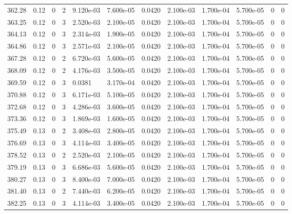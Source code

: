 \documentclass[preview]{standalone}
\begin{document}
{{{{{{{{{\begin{tabular}{L{1.2cm}C{1.2cm} C{0.3cm}C{0.5cm} C{1.4cm}C{1.4cm} C{1.4cm}C{1.4cm} C{1.6cm}C{1.6cm} C{1.6cm}C{1.6cm}}
  362.28  &  0.12  & 0     &  2 &  9.120e-03  & 7.600e-05  &  0.0420&   2.100e-03& 1.700e-04 & 5.700e-05   &  0 & 0  \\ 
  363.25  &  0.12  & 0     &  3 &  2.520e-03  & 2.100e-05  &  0.0420&   2.100e-03& 1.700e-04 & 5.700e-05   &  0 & 0  \\ 
  364.13  &  0.12  & 0     &  3 &  2.314e-03  & 1.900e-05  &  0.0420&   2.100e-03& 1.700e-04 & 5.700e-05   &  0 & 0  \\ 
  364.86  &  0.12  & 0     &  3 &  2.571e-03  & 2.100e-05  &  0.0420&   2.100e-03& 1.700e-04 & 5.700e-05   &  0 & 0  \\ 
  367.28  &  0.12  & 0     &  2 &  6.720e-03  & 5.600e-05  &  0.0420&   2.100e-03& 1.700e-04 & 5.700e-05   &  0 & 0  \\ 
  368.09  &  0.12  & 0     &  2 &  4.176e-03  & 3.500e-05  &  0.0420&   2.100e-03& 1.700e-04 & 5.700e-05   &  0 & 0  \\ 
  369.59  &  0.12  & 0     &  3 &  0.0381  & 3.170e-04  &  0.0420&   2.100e-03& 1.700e-04 & 5.700e-05   &  0 & 0  \\ 
  370.88  &  0.12  & 0     &  3 &  6.171e-03  & 5.100e-05  &  0.0420&   2.100e-03& 1.700e-04 & 5.700e-05   &  0 & 0  \\ 
  372.68  &  0.12  & 0     &  3 &  4.286e-03  & 3.600e-05  &  0.0420&   2.100e-03& 1.700e-04 & 5.700e-05   &  0 & 0  \\ 
  373.36  &  0.12  & 0     &  3 &  1.869e-03  & 1.600e-05  &  0.0420&   2.100e-03& 1.700e-04 & 5.700e-05   &  0 & 0  \\ 
  375.49  &  0.13  & 0     &  2 &  3.408e-03  & 2.800e-05  &  0.0420&   2.100e-03& 1.700e-04 & 5.700e-05   &  0 & 0  \\ 
  376.69  &  0.13  & 0     &  3 &  4.114e-03  & 3.400e-05  &  0.0420&   2.100e-03& 1.700e-04 & 5.700e-05   &  0 & 0  \\ 
  378.52  &  0.13  & 0     &  2 &  2.520e-03  & 2.100e-05  &  0.0420&   2.100e-03& 1.700e-04 & 5.700e-05   &  0 & 0  \\ 
  379.19  &  0.13  & 0     &  3 &  6.686e-03  & 5.600e-05  &  0.0420&   2.100e-03& 1.700e-04 & 5.700e-05   &  0 & 0  \\ 
  380.27  &  0.13  & 0     &  3 &  8.400e-03  & 7.000e-05  &  0.0420&   2.100e-03& 1.700e-04 & 5.700e-05   &  0 & 0  \\ 
  381.40  &  0.13  & 0     &  2 &  7.440e-03  & 6.200e-05  &  0.0420&   2.100e-03& 1.700e-04 & 5.700e-05   &  0 & 0  \\ 
  382.25  &  0.13  & 0     &  3 &  4.114e-03  & 3.400e-05  &  0.0420&   2.100e-03& 1.700e-04 & 5.700e-05   &  0 & 0  \\ 

\end{tabular}}}}}}}}}}
\end{document}
